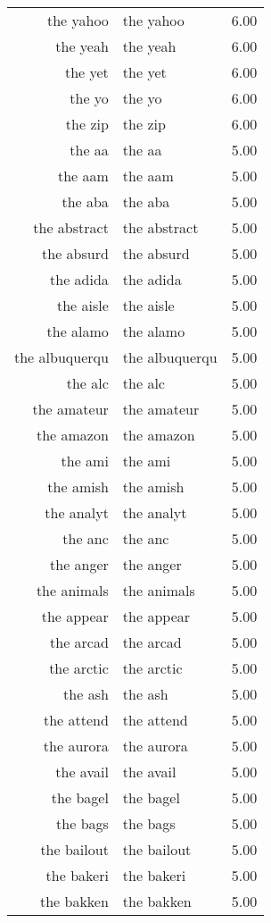 \begin{table}[ht]
\begin{tabular}{rlr}
  the yahoo & the yahoo & 6.00 \\ 
  the yeah & the yeah & 6.00 \\ 
  the yet & the yet & 6.00 \\ 
  the yo & the yo & 6.00 \\ 
  the zip & the zip & 6.00 \\ 
  the aa & the aa & 5.00 \\ 
  the aam & the aam & 5.00 \\ 
  the aba & the aba & 5.00 \\ 
  the abstract & the abstract & 5.00 \\ 
  the absurd & the absurd & 5.00 \\ 
  the adida & the adida & 5.00 \\ 
  the aisle & the aisle & 5.00 \\ 
  the alamo & the alamo & 5.00 \\ 
  the albuquerqu & the albuquerqu & 5.00 \\ 
  the alc & the alc & 5.00 \\ 
  the amateur & the amateur & 5.00 \\ 
  the amazon & the amazon & 5.00 \\ 
  the ami & the ami & 5.00 \\ 
  the amish & the amish & 5.00 \\ 
  the analyt & the analyt & 5.00 \\ 
  the anc & the anc & 5.00 \\ 
  the anger & the anger & 5.00 \\ 
  the animals & the animals & 5.00 \\ 
  the appear & the appear & 5.00 \\ 
  the arcad & the arcad & 5.00 \\ 
  the arctic & the arctic & 5.00 \\ 
  the ash & the ash & 5.00 \\ 
  the attend & the attend & 5.00 \\ 
  the aurora & the aurora & 5.00 \\ 
  the avail & the avail & 5.00 \\ 
  the bagel & the bagel & 5.00 \\ 
  the bags & the bags & 5.00 \\ 
  the bailout & the bailout & 5.00 \\ 
  the bakeri & the bakeri & 5.00 \\ 
  the bakken & the bakken & 5.00 \\ 

\end{tabular}
\end{table}
